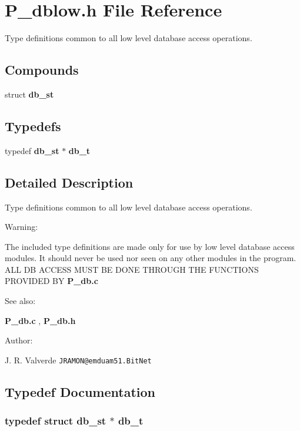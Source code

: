 \section{P\_\-dblow.h File Reference}
\label{P__dblow_8h}
Type definitions common to all low level database access operations. 


\subsection*{Compounds}
\begin{CompactItemize}
\item 
struct {\bf db\_\-st}
\end{CompactItemize}
\subsection*{Typedefs}
\begin{CompactItemize}
\item 
typedef {\bf db\_\-st} $\ast$ {\bf db\_\-t}
\end{CompactItemize}


\subsection{Detailed Description}
Type definitions common to all low level database access operations.

 

 \begin{Desc}
\item[Warning: ]\par
 The included type definitions are made only for use by low  level database access modules. It should never be used nor seen on any other modules in the program. ALL DB ACCESS MUST BE DONE THROUGH THE FUNCTIONS PROVIDED BY {\bf P\_\-db.c}\end{Desc}
\begin{Desc}
\item[See also: ]\par
{\bf P\_\-db.c}  , {\bf P\_\-db.h}\end{Desc}
\begin{Desc}
\item[Author: ]\par
J. R. Valverde {\tt JRAMON@emduam51.Bit\-Net}\end{Desc}


\subsection{Typedef Documentation}
\subsubsection{\setlength{\rightskip}{0pt plus 5cm}typedef struct {\bf db\_\-st} $\ast$ db\_\-t}\label{P__dblow_8h_a0}


